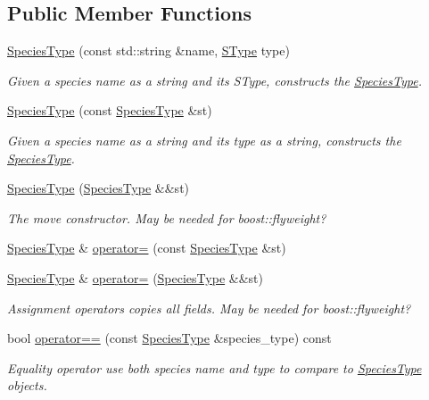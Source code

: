 \subsection*{Public Member Functions}
\begin{DoxyCompactItemize}
\item 
\hyperlink{group__Chemistry_ga57cabe9d486b2b79251a3a3ebcf97424}{Species\-Type} (const std\-::string \&name, \hyperlink{group__Chemistry_ga49104ff0a7d4118feb179c2f1c906f12}{S\-Type} type)
\begin{DoxyCompactList}\small\item\em Given a species name as a string and its S\-Type, constructs the \hyperlink{classSpeciesType}{Species\-Type}. \end{DoxyCompactList}\item 
\hyperlink{group__Chemistry_ga32cbd03ba76d974b223fcc0e5f06b2dc}{Species\-Type} (const \hyperlink{classSpeciesType}{Species\-Type} \&st)
\begin{DoxyCompactList}\small\item\em Given a species name as a string and its type as a string, constructs the \hyperlink{classSpeciesType}{Species\-Type}. \end{DoxyCompactList}\item 
\hyperlink{group__Chemistry_ga93c454d0c3a9677f44d1f4eb1ccc221d}{Species\-Type} (\hyperlink{classSpeciesType}{Species\-Type} \&\&st)
\begin{DoxyCompactList}\small\item\em The move constructor. May be needed for boost\-::flyweight? \end{DoxyCompactList}\item 
\hyperlink{classSpeciesType}{Species\-Type} \& \hyperlink{group__Chemistry_ga2235490067a0ea21ab44c04b29897a67}{operator=} (const \hyperlink{classSpeciesType}{Species\-Type} \&st)
\item 
\hyperlink{classSpeciesType}{Species\-Type} \& \hyperlink{group__Chemistry_ga0f1e812825b343f031f87de4feac68c7}{operator=} (\hyperlink{classSpeciesType}{Species\-Type} \&\&st)
\begin{DoxyCompactList}\small\item\em Assignment operators copies all fields. May be needed for boost\-::flyweight? \end{DoxyCompactList}\item 
bool \hyperlink{group__Chemistry_ga68c675472ea526cab4abdd5b32fb486f}{operator==} (const \hyperlink{classSpeciesType}{Species\-Type} \&species\-\_\-type) const 
\begin{DoxyCompactList}\small\item\em Equality operator use both species name and type to compare to \hyperlink{classSpeciesType}{Species\-Type} objects. \end{DoxyCompactList}\item 

\end{DoxyCompactItemize}
